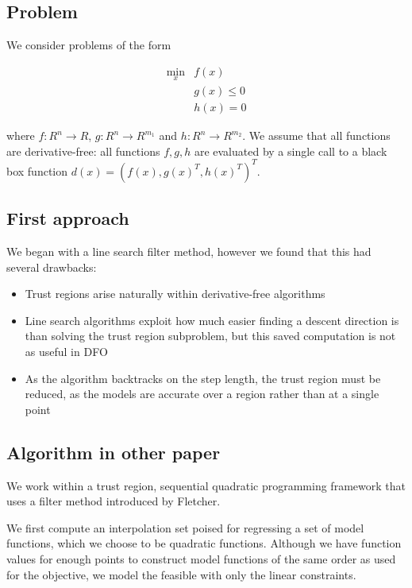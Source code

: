 \documentclass{article}
\begin{document}
\subsection{Problem}

We consider problems of the form

\begin{align*}
\min_x & f(x) \\
 & g(x) \le 0 \\
 & h(x) = 0
\end{align*}

where $f : R^n \to R$, $g : R^{n} \to R^{m_1}$ and $h : R^{n} \to R^{m_2}$.
We assume that all functions are derivative-free: all functions $f,g,h$ are evaluated by a single call to a black box function $d(x) = (f(x), g(x)^T, h(x)^T)^T$.



\subsection{First approach}
We began with a line search filter method, however we found that this had several drawbacks:

\begin{itemize}
\item Trust regions arise naturally within derivative-free algorithms
\item Line search algorithms exploit how much easier finding a descent direction is than solving the trust region subproblem, but this saved computation is not as useful in DFO
\item As the algorithm backtracks on the step length, the trust region must be reduced, as the models are accurate over a region rather than at a single point
\end{itemize}

\subsection{Algorithm in other paper}

We work within a trust region, sequential quadratic programming framework that uses a filter method introduced by Fletcher.

We first compute an interpolation set poised for regressing a set of model functions, which we choose to be quadratic functions.
Although we have function values for enough points to construct model functions of the same order as used for the objective, we model the feasible with only the linear constraints.
\end{document}
